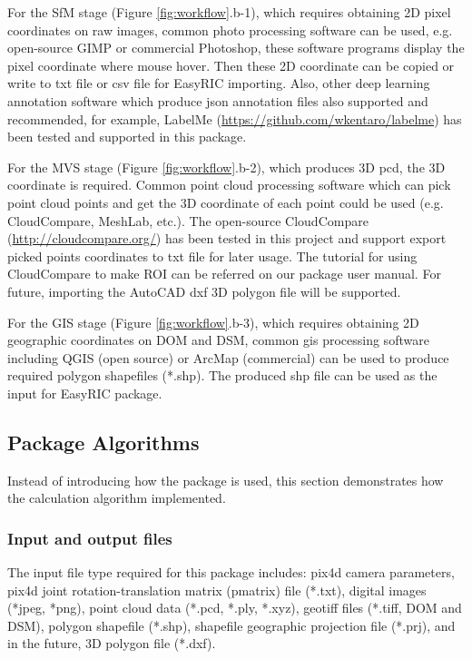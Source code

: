 \documentclass{configs/bmcart}
\begin{document}
For the SfM stage (Figure \ref{fig:workflow}.b-1), which requires obtaining 2D pixel coordinates on raw images, common photo processing software can be used, e.g. open-source GIMP or commercial Photoshop, these software programs display the pixel coordinate where mouse hover. Then these 2D coordinate can be copied or write to txt file or csv file for EasyRIC importing. Also, other deep learning annotation software which produce json annotation files also supported and recommended, for example, LabelMe (\url{https://github.com/wkentaro/labelme}) has been tested and supported in this package.

For the MVS stage (Figure \ref{fig:workflow}.b-2), which produces 3D \acrfull*{pcd}, the 3D coordinate is required. Common point cloud processing software which can pick point cloud points and get the 3D coordinate of each point could be used (e.g. CloudCompare, MeshLab, etc.). The open-source CloudCompare (\url{http://cloudcompare.org/}) has been tested in this project and support export picked points coordinates to txt file for later usage. The tutorial for using CloudCompare to make ROI can be referred on our package user manual. For future, importing the AutoCAD dxf 3D polygon file will be supported.

For the GIS stage (Figure \ref{fig:workflow}.b-3), which requires obtaining 2D geographic coordinates on DOM and DSM, common \acrfull*{gis} processing software including QGIS (open source) or ArcMap (commercial) can be used to produce required polygon shapefiles (*.shp). The produced shp file can be used as the input for EasyRIC package.

\subsection*{Package Algorithms}
Instead of introducing how the package is used, this section demonstrates how the calculation algorithm implemented.

\subsubsection*{Input and output files}
The input file type required for this package includes: pix4d camera parameters, pix4d joint rotation-translation matrix (pmatrix) file (*.txt), digital images (*jpeg, *png), point cloud data (*.pcd, *.ply, *.xyz), geotiff files (*.tiff, DOM and DSM), polygon shapefile (*.shp), shapefile geographic projection file (*.prj), and in the future, 3D polygon file (*.dxf).
\end{document}
